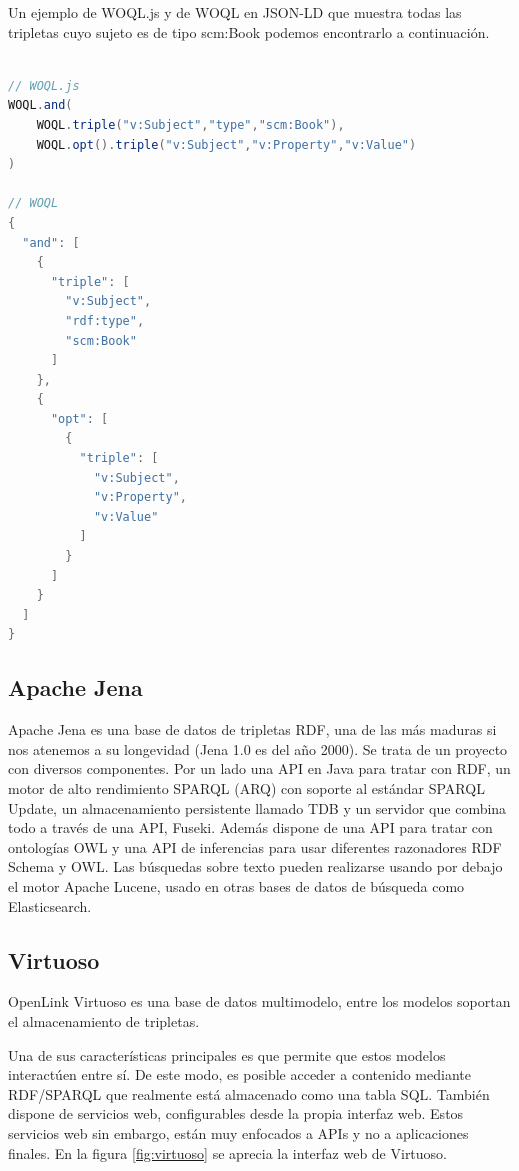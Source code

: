 \documentclass[openright,twoside,12pt]{book}
\begin{document}
Un ejemplo de WOQL.js y de WOQL en JSON-LD que muestra todas las tripletas cuyo sujeto es de tipo scm:Book podemos encontrarlo a continuación.

\noindent\begin{minipage}{\textwidth}
\begin{lstlisting}[language=Java]

// WOQL.js
WOQL.and(
    WOQL.triple("v:Subject","type","scm:Book"),
    WOQL.opt().triple("v:Subject","v:Property","v:Value")
)

// WOQL
{
  "and": [
    {
      "triple": [
        "v:Subject",
        "rdf:type",
        "scm:Book"
      ]
    },
    {
      "opt": [
        {
          "triple": [
            "v:Subject",
            "v:Property",
            "v:Value"
          ]
        }
      ]
    }
  ]
}
\end{lstlisting}
\end{minipage}

\subsection{Apache Jena}
Apache Jena es una base de datos de tripletas RDF, una de las más maduras si nos atenemos a su longevidad (Jena 1.0 es del año 2000)\cite{jena}.
Se trata de un proyecto con diversos componentes. Por un lado una API en Java para tratar con RDF, un motor de alto rendimiento SPARQL (ARQ) con soporte al estándar SPARQL Update, un almacenamiento persistente llamado TDB y un servidor que combina todo a través de una API, Fuseki. Además dispone de una API para tratar con ontologías OWL y una API de inferencias para usar diferentes razonadores RDF Schema y OWL. Las búsquedas sobre texto pueden realizarse usando por debajo el motor Apache Lucene, usado en otras bases de datos de búsqueda como Elasticsearch.


\subsection{Virtuoso}
OpenLink Virtuoso es una base de datos multimodelo, entre los modelos soportan el almacenamiento de tripletas\cite{virtuoso}.

Una de sus características principales es que permite que estos modelos interactúen entre sí. De este modo, es posible acceder a contenido mediante RDF/SPARQL que realmente está almacenado como una tabla SQL. También dispone de servicios web, configurables desde la propia interfaz web. Estos servicios web sin embargo, están muy enfocados a APIs y no a aplicaciones finales. En la figura \ref{fig:virtuoso} se aprecia la interfaz web de Virtuoso.
\end{document}
